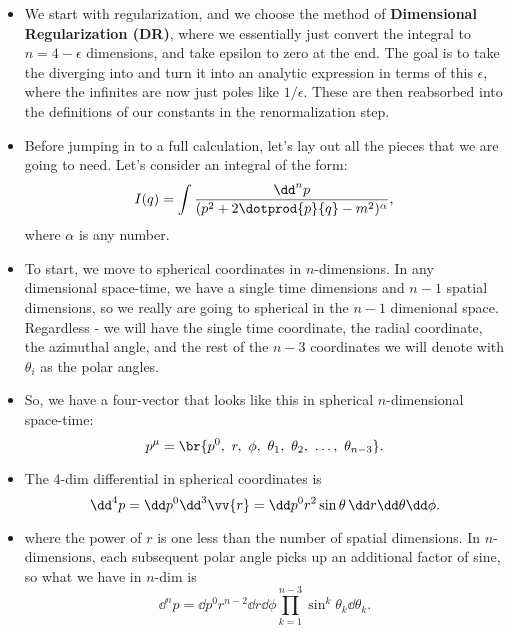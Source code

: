 \begin{itemize}
    \item We start with regularization, and we choose the method of \textbf{Dimensional Regularization (DR)}, where we essentially just convert the integral to $n = 4-\epsilon$ dimensions, and take epsilon to zero at the end. The goal is to take the diverging into and turn it into an analytic expression in terms of this $\epsilon$, where the infinites are now just poles like $1/\epsilon$. These are then reabsorbed into the definitions of our constants in the renormalization step.
    \item Before jumping in to a full calculation, let's lay out all the pieces that we are going to need. Let's consider an integral of the form:
        \begin{equation*}
            I(q) = \int \frac{\dd^n p}{(p^2 + 2\dotprod{p}{q} - m^2)^{\alpha}},
        \end{equation*}
        where $\alpha$ is any number.
    \item To start, we move to spherical coordinates in $n$-dimensions. In any dimensional space-time, we have a single time dimensions and $n-1$ spatial dimensions, so we really are going to spherical in the $n-1$ dimenional space. Regardless - we will have the single time coordinate, the radial coordinate, the azimuthal angle, and the rest of the $n-3$ coordinates we will denote with $\theta_i$ as the polar angles.
    \item So, we have a four-vector that looks like this in spherical $n$-dimensional space-time: 
        \begin{equation*}
            p^{\mu} = \br{p^0,\ r,\ \phi,\ \theta_1,\ \theta_2,\ \ldots,\ \theta_{n-3}}.
        \end{equation*}
    \item The 4-dim differential in spherical coordinates is
        \begin{equation*}
            \dd^4 p = \dd p^0 \dd^3\vv{r} = \dd p^0 r^2\sin\theta \,\dd r\dd \theta\dd \phi.
        \end{equation*}
    \item where the power of $r$ is one less than the number of spatial dimensions. In $n$-dimensions, each subsequent polar angle picks up an additional factor of sine, so what we have in $n$-dim is
        \begin{equation*}
            \dd^n p = \dd p^0 r^{n-2} \dd r \dd\phi \prod_{k=1}^{n-3}\sin^k\theta_k \dd\theta_k.
        \end{equation*}

\end{itemize}
